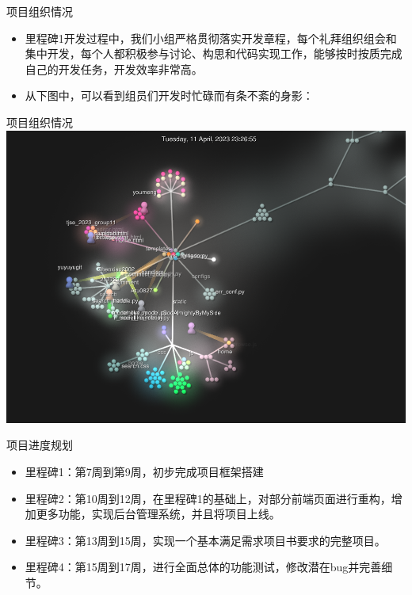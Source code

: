 \begin{frame}{项目组织情况}
    \begin{itemize}
        \item 里程碑1开发过程中，我们小组严格贯彻落实开发章程，每个礼拜组织组会和集中开发，每个人都积极参与讨论、构思和代码实现工作，能够按时按质完成自己的开发任务，开发效率非常高。
        \item 从下图中，可以看到组员们开发时忙碌而有条不紊的身影：
    \end{itemize}
\end{frame}

\begin{frame}{项目组织情况}
    \includegraphics[width=1\textwidth]{contents/figure/commits.png}
\end{frame}

\begin{frame}{项目进度规划}
    \begin{itemize}
        \item 里程碑1：第7周到第9周，初步完成项目框架搭建
        \item 里程碑2：第10周到12周，在里程碑1的基础上，对部分前端页面进行重构，增加更多功能，实现后台管理系统，并且将项目上线。
        \item 里程碑3：第13周到15周，实现一个基本满足需求项目书要求的完整项目。
        \item 里程碑4：第15周到17周，进行全面总体的功能测试，修改潜在bug并完善细节。
    \end{itemize}
\end{frame}